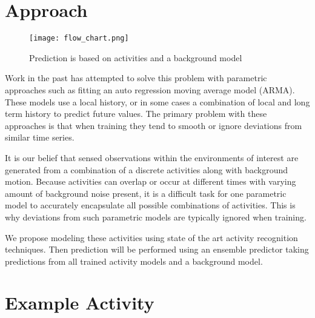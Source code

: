 

\section{Approach}

\begin{wrapfigure}{r}{5cm}
\begin{center}
\texttt{[image: flow\_chart.png]}
\end{center}
\caption{Prediction is based on activities and a background model}
\label{fig:flow_chart}
\end{wrapfigure}

Work in the past has attempted to solve this problem with parametric approaches such as fitting an auto regression moving average model (ARMA).  These models use a local history, or in some cases a combination of local and long term history to predict future values.  The primary problem with these approaches is that when training they tend to smooth or ignore deviations from similar time series.

It is our belief that sensed observations within the environments of interest are generated from a combination of a discrete activities along with background motion.  Because activities can overlap or occur at different times with varying amount of background noise present, it is a difficult task for one parametric model to accurately encapsulate all possible combinations of activities.  This is why deviations from such parametric models are typically ignored when training.

We propose modeling these activities using state of the art activity recognition techniques.  Then prediction will be performed using an ensemble predictor taking predictions from all trained activity models and a background model.  

\section{Example Activity}


